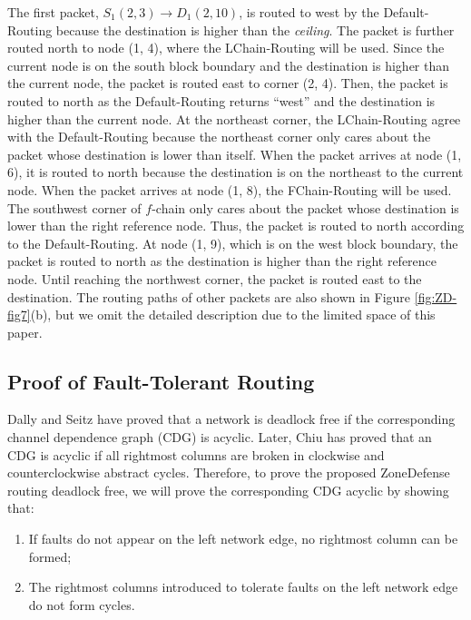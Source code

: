 The first packet, $S_{1}(2, 3) \rightarrow D_{1}(2, 10)$, is routed to west by the Default-Routing because the destination is higher than the \textit{ceiling}. The packet is further routed north to node (1, 4), where the LChain-Routing will be used. Since the current node is on the south block boundary and the destination is higher than the current node, the packet is routed east to corner (2, 4). Then, the packet is routed to north as the Default-Routing returns “west” and the destination is higher than the current node. At the northeast corner, the LChain-Routing agree with the Default-Routing because the northeast corner only cares about the packet whose destination is lower than itself. When the packet arrives at node (1, 6), it is routed to north because the destination is on the northeast to the current node. When the packet arrives at node (1, 8), the FChain-Routing will be used. The southwest corner of $f$-chain only cares about the packet whose destination is lower than the right reference node. Thus, the packet is routed to north according to the Default-Routing. At node (1, 9), which is on the west block boundary, the packet is routed to north as the destination is higher than the right reference node. Until reaching the northwest corner, the packet is routed east to the destination. The routing paths of other packets are also shown in Figure \ref{fig:ZD-fig7}(b), but we omit the detailed description due to the limited space of this paper.

\subsection{Proof of Fault-Tolerant Routing}
Dally and Seitz \cite{dally1988deadlock} have proved that a network is deadlock free if the corresponding channel dependence graph (CDG) is acyclic. Later, Chiu \cite{chiu2000odd} has proved that an CDG is acyclic if all rightmost columns are broken in clockwise and counterclockwise abstract cycles. Therefore, to prove the proposed ZoneDefense routing deadlock free, we will prove the corresponding CDG acyclic by showing that:

\begin{enumerate}[1)]
    \item If faults do not appear on the left network edge, no
        rightmost column can be formed;

    \item The rightmost columns introduced to tolerate faults on
        the left network edge do not form cycles.
\end{enumerate}

